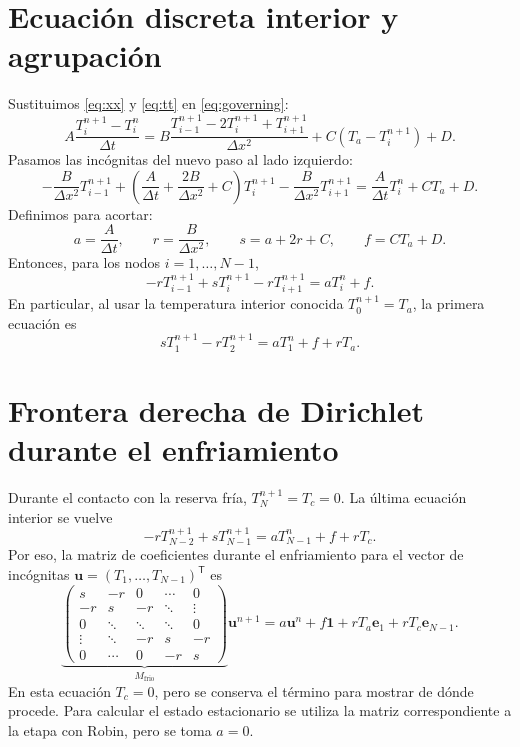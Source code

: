 \documentclass[11pt,a4paper]{article}
\begin{document}
\section{Ecuación discreta interior y agrupación}
Sustituimos \eqref{eq:xx} y \eqref{eq:tt} en \eqref{eq:governing}:
\begin{equation}
A\frac{T_i^{n+1}-T_i^n}{\Delta t}=B\frac{T_{i-1}^{n+1}-2T_i^{n+1}+T_{i+1}^{n+1}}{\Delta x^2}+C(T_a-T_i^{n+1})+D.
\end{equation}
Pasamos las incógnitas del nuevo paso al lado izquierdo:
\begin{equation}\label{eq:row}
-\frac{B}{\Delta x^2}T_{i-1}^{n+1}+
\left(\frac{A}{\Delta t}+\frac{2B}{\Delta x^2}+C\right)T_i^{n+1}
-\frac{B}{\Delta x^2}T_{i+1}^{n+1}
=\frac{A}{\Delta t}T_i^n+CT_a+D.
\end{equation}
Definimos para acortar:
\begin{equation}\label{eq:defs}
 a=\frac A{\Delta t},\qquad r=\frac B{\Delta x^2},\qquad s=a+2r+C,\qquad f=CT_a+D.
\end{equation}
Entonces, para los nodos $i=1,\ldots,N-1$,
\begin{equation}\boxed{-rT_{i-1}^{n+1}+sT_i^{n+1}-rT_{i+1}^{n+1}=aT_i^n+f.}\label{eq:interior}\end{equation}
En particular, al usar la temperatura interior conocida $T_0^{n+1}=T_a$, la primera ecuación es
\begin{equation}\label{eq:first}
sT_1^{n+1}-rT_2^{n+1}=aT_1^n+f+rT_a.
\end{equation}

\section{Frontera derecha de Dirichlet durante el enfriamiento}
Durante el contacto con la reserva fría, $T_N^{n+1}=T_c=0$. La última ecuación interior se vuelve
\begin{equation}\label{eq:cool}
-rT_{N-2}^{n+1}+sT_{N-1}^{n+1}=aT_{N-1}^n+f+rT_c.
\end{equation}
Por eso, la matriz de coeficientes durante el enfriamiento para el vector de incógnitas $\boldsymbol u=(T_1,\dots,T_{N-1})^\mathsf T$ es
\begin{equation}\label{eq:mcool}
\underbrace{\begin{pmatrix}
s&-r&0&\cdots&0\\
-r&s&-r&\ddots&\vdots\\
0&\ddots&\ddots&\ddots&0\\
\vdots&\ddots&-r&s&-r\\
0&\cdots&0&-r&s
\end{pmatrix}}_{M_{\mathrm{frio}}}
\boldsymbol u^{n+1}=
 a\boldsymbol u^n+f\boldsymbol 1+rT_a\boldsymbol e_1+rT_c\boldsymbol e_{N-1}.
\end{equation}
En esta ecuación $T_c=0$, pero se conserva el término para mostrar de dónde procede. Para calcular el estado estacionario se utiliza la matriz correspondiente a la etapa con Robin, pero se toma $a=0$.
\end{document}
